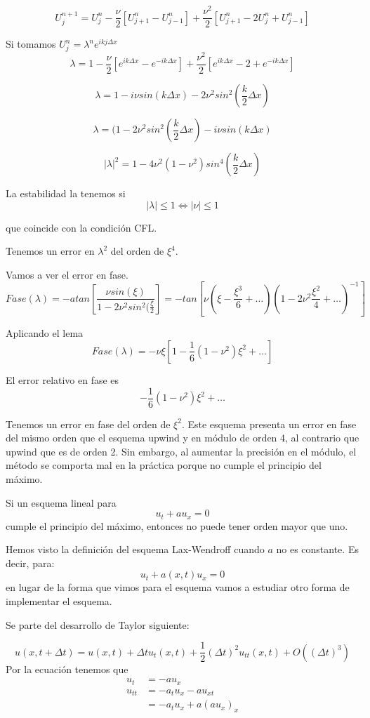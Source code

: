 $$U_j^{n+1} = U_j^n - \frac{\nu}{2}\left[U_{j+1}^n-U_{j-1}^n\right] + \frac{\nu^2}{2}\left[U_{j+1}^{n}-2U_{j}^{n}+U_{j-1}^{n}\right]$$

Si tomamos $U_j^n = \lambda ^n e^{ikj\Delta x}$
$$\lambda = 1 - \frac{\nu}{2}\left[e^{ik\Delta x}-e^{-ik\Delta x}\right]+\frac{\nu^2}{2}\left[e^{ik\Delta x}-2+e^{-ik\Delta x}\right]$$

$$\lambda = 1-i\nu sin(k\Delta x) - 2\nu ^2sin^2(\frac{k}{2}\Delta x)$$

$$\lambda = (1-2\nu^2sin^2(\frac{k}{2}\Delta x)-i\nu sin(k\Delta x)$$

$$|\lambda|^2 = 1-4\nu^2(1-\nu^2)sin^4(\frac{k}{2}\Delta x)$$

La estabilidad la tenemos si 
$$|\lambda|\le 1 \iff |\nu| \le 1$$

que coincide con la condición CFL.

Tenemos un error en $\lambda^2$ del orden de $\xi^4$.

Vamos a ver el error en fase.
$$Fase(\lambda) = -atan\left[\frac{\nu sin(\xi)}{1-2\nu^2sin^2(\frac{\xi}{2}}\right] = -tan\left[\nu(\xi-\frac{\xi^3}{6}+\hdots)(1-2\nu^2\frac{\xi^2}{4}+\hdots )^{-1}\right]$$

Aplicando el lema
$$Fase(\lambda) = -\nu\xi\left[1-\frac{1}{6}(1-\nu^2)\xi^2+\hdots\right]$$

El error relativo en fase es
$$-\frac{1}{6}(1-\nu^2)\xi^2+\hdots$$

Tenemos un error en fase del orden de $\xi^2$. Este esquema presenta un error en fase del mismo orden que el esquema upwind y en módulo de orden 4, al contrario que upwind que es de orden 2. Sin embargo, al aumentar la precisión en el módulo, el método se comporta mal en la práctica porque no cumple el principio del máximo.

\begin{theorem}
	Si un esquema lineal para $$u_t+au_x = 0$$
	cumple el principio del máximo, entonces no puede tener orden mayor que uno.
\end{theorem}

Hemos visto la definición del esquema Lax-Wendroff cuando $a$ no es constante. Es decir, para:
$$u_t+a(x,t)u_x = 0$$
en lugar de la forma que vimos para el esquema vamos a estudiar otro forma de implementar el esquema.

Se parte del desarrollo de Taylor siguiente:

$$u(x,t+\Delta t) = u(x,t) + \Delta t u_t(x,t) + \frac{1}{2}(\Delta t)^2 u_{tt}(x,t)+O((\Delta t )^3)$$
Por la ecuación tenemos que
\begin{align*}
	u_t &= -au_x\\
	u_{tt} &= -a_tu_x-au_{xt} \\
	&= -a_tu_x+a(au_x)_x
\end{align*}

